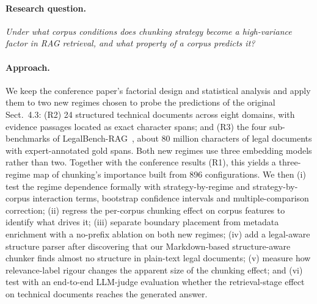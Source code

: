 \documentclass[runningheads]{llncs}
\begin{document}
\paragraph{Research question.} \emph{Under what corpus conditions does chunking strategy become a high-variance factor in RAG retrieval, and what property of a corpus predicts it?}

\paragraph{Approach.} We keep the conference paper's factorial design and statistical analysis and apply them to two new regimes chosen to probe the predictions of the original Sect.~4.3: (R2) 24 structured technical documents across eight domains, with evidence passages located as exact character spans; and (R3) the four sub-benchmarks of LegalBench-RAG~\cite{pipitone2024legalbenchrag}, about 80 million characters of legal documents with expert-annotated gold spans. Both new regimes use three embedding models rather than two. Together with the conference results (R1), this yields a three-regime map of chunking's importance built from 896 configurations. We then (i) test the regime dependence formally with strategy-by-regime and strategy-by-corpus interaction terms, bootstrap confidence intervals and multiple-comparison correction; (ii) regress the per-corpus chunking effect on corpus features to identify what drives it; (iii) separate boundary placement from metadata enrichment with a no-prefix ablation on both new regimes; (iv) add a legal-aware structure parser after discovering that our Markdown-based structure-aware chunker finds almost no structure in plain-text legal documents; (v) measure how relevance-label rigour changes the apparent size of the chunking effect; and (vi) test with an end-to-end LLM-judge evaluation whether the retrieval-stage effect on technical documents reaches the generated answer.
\end{document}
